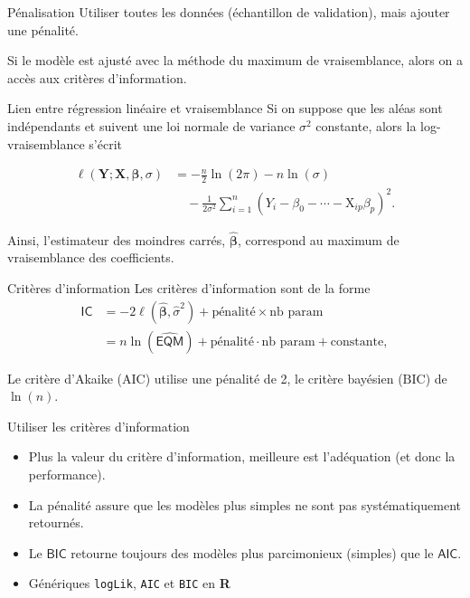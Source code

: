 \documentclass[
  ignorenonframetext,
]{beamer}
\providecommand{\tightlist}{%
  \setlength{\itemsep}{0pt}\setlength{\parskip}{0pt}}\usepackage{longtable,booktabs,array}
\begin{document}
\begin{frame}{Pénalisation}
\protect\hypertarget{puxe9nalisation}{}
Utiliser toutes les données (échantillon de validation), mais ajouter
une pénalité.

Si le modèle est ajusté avec la méthode du maximum de vraisemblance,
alors on a accès aux critères d'information.
\end{frame}

\begin{frame}{Lien entre régression linéaire et vraisemblance}
\protect\hypertarget{lien-entre-ruxe9gression-linuxe9aire-et-vraisemblance}{}
Si on suppose que les aléas sont indépendants et suivent une loi normale
de variance \(\sigma^2\) constante, alors la log-vraisemblance s'écrit

\begin{align*}
\ell(\boldsymbol{Y}; \mathbf{X}, \boldsymbol{\beta}, \sigma) & = -\frac{n}{2}\ln(2\pi) -n\ln(\sigma) \\&\quad - \frac{1}{2\sigma^2}\sum_{i=1}^n (Y_i - \beta_0 - \cdots - \mathrm{X}_{ip}\beta_p)^2.
\end{align*}

Ainsi, l'estimateur des moindres carrés,
\(\widehat{\boldsymbol{\beta}}\), correspond au maximum de vraisemblance
des coefficients.
\end{frame}

\begin{frame}{Critères d'information}
\protect\hypertarget{crituxe8res-dinformation}{}
Les critères d'information sont de la forme \begin{align*}
\mathsf{IC} &=-2 \ell(\widehat{\boldsymbol{\beta}}, \widehat{\sigma}^2) +\text{pénalité}\times \text{nb param} \\&= n \ln (\widehat{\mathsf{EQM}}) +\text{pénalité}\cdot \text{nb param}+ \text{constante},
\end{align*}

Le critère d'Akaike (\(\text{AIC}\)) utilise une pénalité de 2, le
critère bayésien (\(\text{BIC}\)) de \(\ln(n)\).
\end{frame}

\begin{frame}[fragile]{Utiliser les critères d'information}
\protect\hypertarget{utiliser-les-crituxe8res-dinformation}{}
\begin{itemize}
\tightlist
\item
  Plus la valeur du critère d'information, meilleure est l'adéquation
  (et donc la performance).
\item
  La pénalité assure que les modèles plus simples ne sont pas
  systématiquement retournés.
\item
  Le \(\textsf{BIC}\) retourne toujours des modèles plus parcimonieux
  (simples) que le \(\textsf{AIC}\).
\item
  Génériques \texttt{logLik}, \texttt{AIC} et \texttt{BIC} en \textbf{R}
\end{itemize}
\end{frame}
\end{document}
